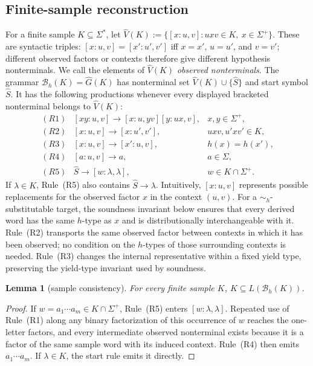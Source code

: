 \documentclass[11pt,a4paper]{article}
\newtheorem{lemma}[theorem]{Lemma}
\theoremstyle{remark}
\theoremstyle{plain}
\begin{document}
\subsection{Finite-sample reconstruction}
For a finite sample $K\subseteq\Sigma^*$, let
$\widehat V(K):=\{[x:u,v]:uxv\in K,\ x\in\Sigma^+\}$.
These are syntactic triples: $[x:u,v]=[x':u',v']$ iff
$x=x'$, $u=u'$, and $v=v'$; different observed factors or contexts therefore
give different hypothesis nonterminals.  We call the elements of
$\widehat V(K)$ \emph{observed nonterminals}.
The grammar $\mathcal B_h(K)=\widehat G(K)$ has nonterminal set
$\widehat V(K)\cup\{\widehat S\}$ and start symbol $\widehat S$.  It has the
following productions whenever every displayed bracketed nonterminal belongs
to $\widehat V(K)$:
\[
\begin{array}{rll}
(R1)&[xy:u,v]\to[x:u,yv][y:ux,v],&x,y\in\Sigma^+,\\[1mm]
(R2)&[x:u,v]\to[x:u',v'],&uxv,u'xv'\in K,\\[1mm]
(R3)&[x:u,v]\to[x':u,v],&h(x)=h(x'),\\[1mm]
(R4)&[a:u,v]\to a,&a\in\Sigma,\\[1mm]
(R5)&\widehat S\to[w:\lambda,\lambda],&w\in K\cap\Sigma^+.
\end{array}
\]
If $\lambda\in K$, Rule~(R5) also contains $\widehat S\to\lambda$.
Intuitively, $[x:u,v]$ represents possible replacements for the observed
factor $x$ in the context $(u,v)$.  For a $\sim_h$-substitutable target, the
soundness invariant below ensures that every derived word has the same
$h$-type as $x$ and is distributionally interchangeable with it.
Rule~(R2) transports the same observed factor between contexts in which
it has been observed; no condition on the $h$-types of those surrounding
contexts is needed.  Rule~(R3) changes the internal representative within a
fixed yield type, preserving the yield-type invariant used by soundness.

\begin{lemma}[sample consistency]\label{lem:sample-consistency}
For every finite sample $K$, $K\subseteq L(\mathcal B_h(K))$.
\end{lemma}
\begin{proof}
If $w=a_1\cdots a_m\in K\cap\Sigma^+$, Rule~(R5) enters
$[w:\lambda,\lambda]$.  Repeated use of Rule~(R1) along any binary
factorization of this occurrence of $w$ reaches the one-letter factors, and
every intermediate observed nonterminal exists because it is a factor of the
same sample word with its induced context.  Rule~(R4) then emits
$a_1\cdots a_m$.  If $\lambda\in K$, the start rule emits it directly.
\end{proof}
\end{document}
